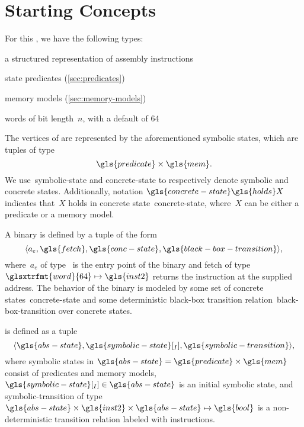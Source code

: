 \section{Starting Concepts}\label{hg-concepts}
For this , we have the following types:
\begin{description}[leftmargin=!,labelwidth=\widthof{\bfseries \glsentryname{mem}}]
  \item[\gls{inst2}] a structured representation of assembly instructions
  \item[\gls{predicate}] state predicates (\cref{sec:predicates})
  \item[\gls{mem}] memory models (\cref{sec:memory-models})
  \item[\glsxtrfmt{word}n] words of bit length~$n$, with a default of \SI{64}\bit
\end{description}
The vertices of  are represented by the aforementioned symbolic states, which are tuples of type
\begin{equation*}
  \gls{predicate}\times\gls{mem}.
\end{equation*}
We use~\gls{symbolic-state} and \gls{concrete-state} to respectively denote symbolic and concrete states.
Additionally, notation $\gls{concrete-state}\gls{holds}X$ indicates that~$X$ holds in concrete state~\gls{concrete-state},
where~$X$ can be either a predicate or a memory model.
\begin{definition}[Binaries]
  A binary is defined by a tuple of the form
  \begin{equation*}
    \langle a_e,\gls{fetch},\gls{conc-state},\gls{black-box-transition}\rangle,
  \end{equation*}
  where~$a_e$ of type~ is the entry point of the binary and \gls{fetch} of type $\glsxtrfmt{word}{64}\mapsto\gls{inst2}$ returns the instruction at the supplied address.
  The behavior of the binary is modeled by some set of concrete states~\gls{concrete-state} and some deterministic black-box transition relation~\gls{black-box-transition} over concrete states.
\end{definition}
\begin{definition}
   is defined as a tuple
  \begin{equation*}
    \langle\gls{abs-state}, \gls{symbolic-state}[_I], \gls{symbolic-transition}\rangle,
  \end{equation*}
  where symbolic states in $\gls{abs-state}=\gls{predicate}\times\gls{mem}$ consist of predicates and memory models, $\gls{symbolic-state}[_I] \in \gls{abs-state}$ is an initial symbolic state, and \gls{symbolic-transition} of type $\gls{abs-state} \times \gls{inst2}\times\gls{abs-state}\mapsto\gls{bool}$ is a non-deterministic transition relation labeled with instructions.
\end{definition}

